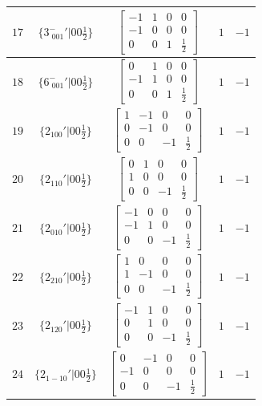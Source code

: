 \documentclass[fleqn,8pt]{jsarticle}
\begin{document}
\begin{longtable}{ccccc}
$ 17 $ & $ \{3^{-}_{\,\,001}{}'|0 0 \frac{1}{2}\} $ & $ \begin{bmatrix} -1 & 1 & 0 & 0 \\ -1 & 0 & 0 & 0 \\ 0 & 0 & 1 & \frac{1}{2} \end{bmatrix} $ & $ 1 $ & $ -1 $ \\ \hline
$ 18 $ & $ \{6^{-}_{\,\,001}{}'|0 0 \frac{1}{2}\} $ & $ \begin{bmatrix} 0 & 1 & 0 & 0 \\ -1 & 1 & 0 & 0 \\ 0 & 0 & 1 & \frac{1}{2} \end{bmatrix} $ & $ 1 $ & $ -1 $ \\ \hline
$ 19 $ & $ \{2{}_{100}{}'|0 0 \frac{1}{2}\} $ & $ \begin{bmatrix} 1 & -1 & 0 & 0 \\ 0 & -1 & 0 & 0 \\ 0 & 0 & -1 & \frac{1}{2} \end{bmatrix} $ & $ 1 $ & $ -1 $ \\ \hline
$ 20 $ & $ \{2{}_{110}{}'|0 0 \frac{1}{2}\} $ & $ \begin{bmatrix} 0 & 1 & 0 & 0 \\ 1 & 0 & 0 & 0 \\ 0 & 0 & -1 & \frac{1}{2} \end{bmatrix} $ & $ 1 $ & $ -1 $ \\ \hline
$ 21 $ & $ \{2{}_{010}{}'|0 0 \frac{1}{2}\} $ & $ \begin{bmatrix} -1 & 0 & 0 & 0 \\ -1 & 1 & 0 & 0 \\ 0 & 0 & -1 & \frac{1}{2} \end{bmatrix} $ & $ 1 $ & $ -1 $ \\ \hline
$ 22 $ & $ \{2{}_{210}{}'|0 0 \frac{1}{2}\} $ & $ \begin{bmatrix} 1 & 0 & 0 & 0 \\ 1 & -1 & 0 & 0 \\ 0 & 0 & -1 & \frac{1}{2} \end{bmatrix} $ & $ 1 $ & $ -1 $ \\ \hline
$ 23 $ & $ \{2{}_{120}{}'|0 0 \frac{1}{2}\} $ & $ \begin{bmatrix} -1 & 1 & 0 & 0 \\ 0 & 1 & 0 & 0 \\ 0 & 0 & -1 & \frac{1}{2} \end{bmatrix} $ & $ 1 $ & $ -1 $ \\ \hline
$ 24 $ & $ \{2{}_{1-10}{}'|0 0 \frac{1}{2}\} $ & $ \begin{bmatrix} 0 & -1 & 0 & 0 \\ -1 & 0 & 0 & 0 \\ 0 & 0 & -1 & \frac{1}{2} \end{bmatrix} $ & $ 1 $ & $ -1 $ \\
\end{longtable}
\end{document}
